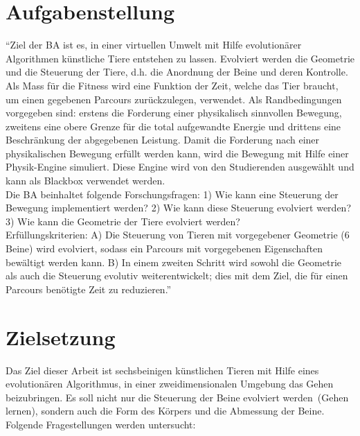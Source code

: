 
  \section{Aufgabenstellung}

    ``Ziel der BA ist es,
    in einer virtuellen Umwelt mit Hilfe evolutionärer Algorithmen künstliche Tiere entstehen zu lassen.
    Evolviert werden die Geometrie und die Steuerung der Tiere,
    d.h. die Anordnung der Beine und deren Kontrolle.
    Als Mass für die Fitness wird eine Funktion der Zeit, welche das Tier braucht,
    um einen gegebenen Parcours zurückzulegen, verwendet.
    Als Randbedingungen vorgegeben sind: erstens die Forderung einer physikalisch sinnvollen Bewegung,
    zweitens eine obere Grenze für die total aufgewandte Energie und drittens eine Beschränkung der abgegebenen Leistung.
    Damit die Forderung nach einer physikalischen Bewegung erfüllt werden kann,
    wird die Bewegung mit Hilfe einer Physik-Engine simuliert.
    Diese Engine wird von den Studierenden ausgewählt und kann als Blackbox verwendet werden.
    \\
    Die BA beinhaltet folgende Forschungsfragen: 1) Wie kann eine Steuerung der Bewegung implementiert werden?
    2) Wie kann diese Steuerung evolviert werden? 3) Wie kann die Geometrie der Tiere evolviert werden?
    \\
    Erfüllungskriterien: A) Die Steuerung von Tieren mit vorgegebener Geometrie (6 Beine) wird evolviert,
    sodass ein Parcours mit vorgegebenen Eigenschaften bewältigt werden kann.
    B) In einem zweiten Schritt wird sowohl die Geometrie als auch die Steuerung evolutiv weiterentwickelt;
    dies mit dem Ziel, die für einen Parcours benötigte Zeit zu reduzieren.''~\cite{Task}

  \section{Zielsetzung}

    Das Ziel dieser Arbeit ist sechsbeinigen künstlichen Tieren mit Hilfe eines evolutionären Algorithmus,
    in einer zweidimensionalen Umgebung das Gehen beizubringen.
    Es soll nicht nur die Steuerung der Beine evolviert werden~(Gehen lernen),
    sondern auch die Form des Körpers und die Abmessung der Beine.
    \\
    Folgende Fragestellungen werden untersucht:

